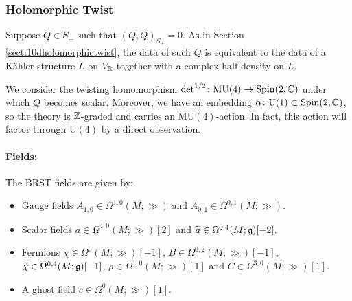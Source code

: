 \documentclass[10pt, oneside]{article}
\newcommand{\MU}{\mathrm{MU}}
\renewcommand{\U}{\mathrm{U}}
\begin{document}
\subsubsection{Holomorphic Twist}
\label{sect:8dholomorphictwist}

Suppose $Q\in S_+$ such that $(Q, Q)_{S_+}=0$. As in Section \ref{sect:10dholomorphictwist}, the data of such $Q$ is equivalent to the data of a K\"ahler structure $L$ on $V_\mathbb R$ together with a complex half-density on $L$.

We consider the twisting homomorphism $\det^{1/2}\colon \MU(4)\rightarrow \Spin(2, \CC)$ under which $Q$ becomes scalar. Moreover, we have an embedding $\alpha\colon \U(1)\subset\Spin(2, \CC)$, so the theory is $\mathbb Z$-graded and carries an $\MU(4)$-action. In fact, this action will factor through $\U(4)$ by a direct observation.

\vspace{-10pt}
\paragraph{Fields:} The BRST fields are given by:
\begin{itemize}
\item Gauge fields $A_{1, 0}\in\Omega^{1, 0}(M; \gg)$ and $A_{0, 1}\in\Omega^{0, 1}(M; \gg)$.
\item Scalar fields $a\in\Omega^{4,0}(M; \gg)[2]$ and $\widetilde{a}\in\Omega^{0, 4}(M; \mathfrak{g})[-2]$.
\item Fermions $\chi\in\Omega^0(M; \gg)[-1]$, $B\in\Omega^{0, 2}(M; \gg)[-1]$, $\widetilde{\chi}\in\Omega^{0, 4}(M; \mathfrak{g})[-1]$, $\rho\in\Omega^{1, 0}(M; \gg)[1]$ and $C\in\Omega^{3, 0}(M; \gg)[1]$.
\item A ghost field $c\in \Omega^0(M; \gg)[1]$.
\end{itemize}
\end{document}

